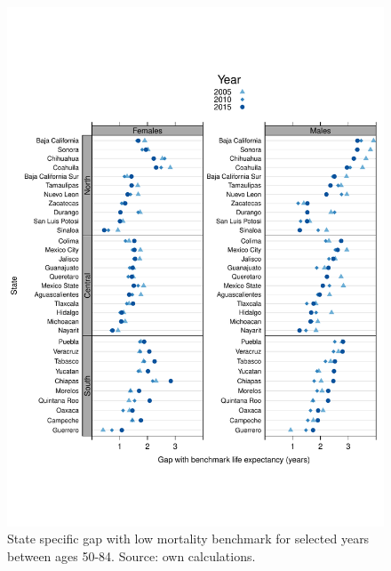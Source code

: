 \documentclass[11.5pt]{article}
\begin{document}
{\begin{figure}
\centering
\caption{State specific gap with low mortality benchmark for selected years between ages 50-84. Source: own calculations.}
\begin{center}
\includegraphics[scale=.8]{Distance_oa.pdf}
\end{center}
\end{figure}






}
\end{document}
